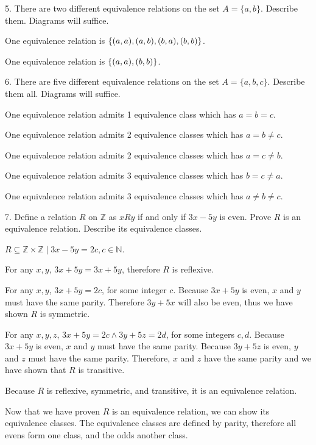 \documentclass{article}
\begin{document}
\begin{exercise}{}{}{5. There are two different equivalence relations on the set
		$A=\{a, b\}$. Describe them. Diagrams will suffice.}
	\begin{alist}
		\item One equivalence relation is $\{(a, a), (a, b), (b, a), (b, b)\}$.
		\item One equivalence relation is $\{(a, a), (b, b)\}$.
	\end{alist}
\end{exercise}{}{}

\begin{exercise}{}{}{6. There are five different equivalence relations on the set
		$A=\{a, b, c\}$. Describe them all. Diagrams will suffice.}
	\begin{alist}
		\item One equivalence relation admits 1 equivalence class which has $a=b=c$.
		\item One equivalence relation admits 2 equivalence classes which has $a=b\neq c$.
		\item One equivalence relation admits 2 equivalence classes which has $a=c\neq b$.
		\item One equivalence relation admits 3 equivalence classes which has $b=c\neq a$.
		\item One equivalence relation admits 3 equivalence classes which has $a\neq b\neq c$.
	\end{alist}
\end{exercise}{}{}

\begin{exercise}{}{}{7. Define a relation $R$ on $\mathbb{Z}$ as $x R y$ if and
		only if $3 x-5 y$ is even. Prove $R$ is an equivalence relation. Describe its
		equivalence classes.}
	\begin{alist}
		\item $R\subseteq \mathbb{Z}\times\mathbb{Z}\mid 3x-5y=2c, c\in\mathbb{N}$.
		\item For any $x, y$, $3x+5y=3x+5y$, therefore $R$ is reflexive.
		\item For any $x, y$, $3x+5y=2c$, for some integer $c$. Because $3x+5y$ is even,
		$x$ and $y$ must have the same parity.  Therefore $3y+5x$ will also be even,
		thus we have shown $R$ is symmetric.
		\item For any $x, y, z$, $3x+5y=2c \land 3y+5z=2d$, for some integers $c, d$.
		Because $3x+5y$ is even, $x$ and $y$ must have the same parity.
		Because $3y+5z$ is even, $y$ and $z$ must have the same parity. Therefore,
		$x$ and $z$ have the same parity and we have shown that $R$ is transitive.
		\item Because $R$ is reflexive, symmetric, and transitive, it is an equivalence
		relation.
		\item Now that we have proven $R$ is an equivalence relation, we can show its
		equivalence classes. The equivalence classes are defined by parity,
		therefore all evens form one class, and the odds another class.
	\end{alist}
\end{exercise}{}{}
\end{document}
